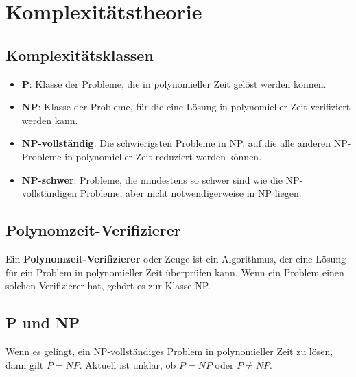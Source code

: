 \documentclass{article}
\begin{document}
\section*{Komplexitätstheorie}
\begin{minipage}[t]{0.45\textwidth}
    \subsection*{Komplexitätsklassen}
    \begin{itemize}
        \item \textbf{P}: Klasse der Probleme, die in polynomieller Zeit gelöst werden können.
        \item \textbf{NP}: Klasse der Probleme, für die eine Lösung in polynomieller Zeit verifiziert werden kann.
        \item \textbf{NP-vollständig}: Die schwierigsten Probleme in NP, auf die alle anderen NP-Probleme in polynomieller Zeit reduziert werden können.
        \item \textbf{NP-schwer}: Probleme, die mindestens so schwer sind wie die NP-vollständigen Probleme, aber nicht notwendigerweise in NP liegen.
    \end{itemize}

    \subsection*{Polynomzeit-Verifizierer}
    Ein \textbf{Polynomzeit-Verifizierer} oder Zeuge ist ein Algorithmus, der eine Lösung für ein Problem in polynomieller Zeit überprüfen kann. Wenn ein Problem einen solchen Verifizierer hat, gehört es zur Klasse NP.

    \subsection*{P und NP}
    Wenn es gelingt, ein NP-vollständiges Problem in polynomieller Zeit zu lösen, dann gilt $P = NP$. Aktuell ist unklar, ob $P = NP$ oder $P \neq NP$.
\end{minipage}
\hfill
\end{document}
